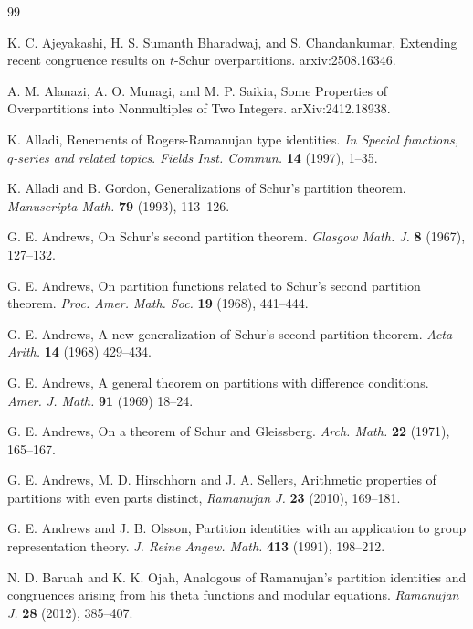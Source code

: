 \documentclass[12pt]{amsart}
\theoremstyle{plain}
\theoremstyle{definition}
\begin{document}
     
\begin{thebibliography}{99}


 K. C. Ajeyakashi, H. S. Sumanth Bharadwaj, and S. Chandankumar, Extending recent congruence results on $t$-Schur overpartitions. arxiv:2508.16346.

 A. M. Alanazi, A. O. Munagi, and M. P. Saikia, Some Properties of Overpartitions into Nonmultiples of Two Integers. 	arXiv:2412.18938.

 K. Alladi, Renements of Rogers-Ramanujan type identities. \textit{In Special functions, $q$-series and related topics}. \textit{Fields Inst. Commun.} \textbf{14} (1997), 1--35.

 K. Alladi and B. Gordon, Generalizations of Schur's partition theorem. \textit{Manuscripta Math.} \textbf{79} (1993), 113--126.

 G. E. Andrews, On Schur's second partition theorem. \textit{Glasgow Math. J.} \textbf{8} (1967), 127--132.

 G. E. Andrews, On partition functions related to Schur's second partition theorem. \textit{Proc. Amer. Math. Soc.} \textbf{19} (1968), 441--444.

 G. E. Andrews, A new generalization of Schur's second partition theorem. \textit{Acta Arith.} \textbf{14} (1968) 429--434.


 G. E. Andrews, A general theorem on partitions with difference conditions. \textit{Amer. J. Math.} \textbf{91} (1969) 18--24.


 G. E. Andrews, On a theorem of Schur and Gleissberg. \textit{Arch. Math.} \textbf{22} (1971), 165--167.


 G. E. Andrews, M. D. Hirschhorn and J. A. Sellers, Arithmetic properties of partitions with even parts distinct,\textit{ Ramanujan J.} \textbf{23} (2010), 169--181.


 G. E. Andrews and J. B. Olsson, Partition identities with an application to group representation theory. \textit{J. Reine Angew. Math.} \textbf{413} (1991), 198--212.



 N. D. Baruah and K. K. Ojah, Analogous of Ramanujan's partition identities and congruences arising from his theta functions and modular equations. \textit{Ramanujan J.} \textbf{28} (2012), 385--407.


\end{thebibliography}
\end{document}
